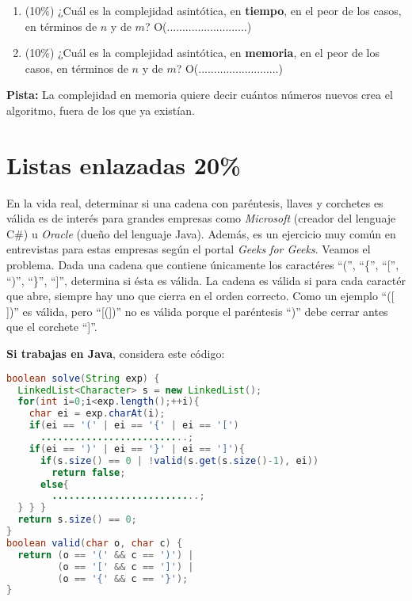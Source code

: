 \documentclass[10 pt]{article}
\begin{document}
 

\begin{enumerate}[label=(\Alph*)]
	\item (10\%) ¿Cuál es la complejidad asintótica, en \textbf{tiempo}, en el peor de los casos, en términos de $n$ y de $m$? O(..........................)
	\item (10\%) ¿Cuál es la complejidad asintótica, en \textbf{memoria}, en el peor de los casos, en términos de $n$ y de $m$? O(..........................)
\end{enumerate}

\textbf{Pista:} La complejidad en memoria quiere decir cuántos números nuevos crea el algoritmo, fuera de los que ya existían.

\newpage


\section{Listas enlazadas 20\%}

En la vida real, determinar si una cadena con paréntesis, llaves y corchetes es válida es de interés para grandes empresas como \emph{Microsoft} (creador del lenguaje C\#) u \emph{Oracle } (dueño del lenguaje Java). Además, es un ejercicio muy común en entrevistas para estas empresas según el portal \emph{Geeks for Geeks}. Veamos el problema. 
Dada una cadena que contiene únicamente los caractéres ``('', ``\{'', ``['', ``)'', ``\}'', ``]'', determina si ésta es válida. La cadena es válida si para cada caractér que abre, siempre hay uno que cierra en el orden correcto. Como un ejemplo ``([ ])'' es válida, pero ``[({}])'' no es válida porque el paréntesis ``)'' debe cerrar antes que el corchete ``]''.

\hspace{1cm}

\textbf{Si trabajas en Java}, considera este código:

\begin{lstlisting}[language=Java]
boolean solve(String exp) {
  LinkedList<Character> s = new LinkedList();
  for(int i=0;i<exp.length();++i){
    char ei = exp.charAt(i);
    if(ei == '(' | ei == '{' | ei == '[')
      ..........................;
    if(ei == ')' | ei == '}' | ei == ']'){
      if(s.size() == 0 | !valid(s.get(s.size()-1), ei))
        return false;
      else{
        ..........................;
  } } }
  return s.size() == 0;
}
boolean valid(char o, char c) {
  return (o == '(' && c == ')') |
         (o == '[' && c == ']') |
         (o == '{' && c == '}');
}
\end{lstlisting}
\end{document}
